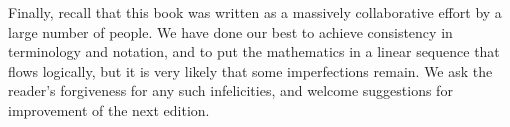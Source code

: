 Finally, recall that this book was written as a massively collaborative effort by a large number of people.
We have done our best to achieve consistency in terminology and notation, and to put the mathematics in a linear sequence that flows logically, but it is very likely that some imperfections remain.
We ask the reader's forgiveness for any such infelicities, and welcome suggestions for improvement of the next edition.



